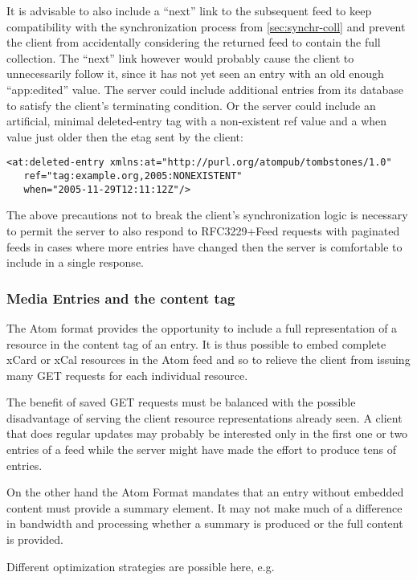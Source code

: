 \documentclass[12pt,a4paper,twoside]{scrartcl}		%
\begin{document}
It is advisable to also include a ``next'' link to the subsequent feed to keep
compatibility with the synchronization process from \autoref{sec:synchr-coll}
and prevent the client from accidentally considering the returned feed to
contain the full collection. The ``next'' link however would probably cause the
client to unnecessarily follow it, since it has not yet seen an entry with an
old enough ``app:edited'' value. The server could include additional entries
from its database to satisfy the client's terminating condition. Or the server
could include an artificial, minimal
deleted-entry\cite{draft-snell-atompub-tombstones-14} tag with a non-existent
ref value and a when value just older then the etag sent by the client:
\begin{lstlisting}
<at:deleted-entry xmlns:at="http://purl.org/atompub/tombstones/1.0"
   ref="tag:example.org,2005:NONEXISTENT"
   when="2005-11-29T12:11:12Z"/>
\end{lstlisting}
The above precautions not to break the client's synchronization logic is
necessary to permit the server to also respond to RFC3229+Feed requests with
paginated feeds in cases where more entries have changed then the server is
comfortable to include in a single response.

\subsubsection{Media Entries and the content tag}
\label{sec:inline-feeds-or}

The Atom format provides the opportunity to include a full representation of a
resource in the content tag of an entry\cite[sec. 4.1.3]{RFC4287}. It is thus
possible to embed complete xCard or xCal resources in the Atom feed
and so to relieve the client from issuing many GET requests for each individual
resource.

The benefit of saved GET requests must be balanced with the possible
disadvantage of serving the client resource representations already seen. A
client that does regular updates may probably be interested only in the first
one or two entries of a feed while the server might have made the effort to
produce tens of entries.

On the other hand the Atom Format mandates that an entry without embedded
content must provide a summary element. It may not make much of a difference in
bandwidth and processing whether a summary is produced or the full content is
provided.

Different optimization strategies are possible here, e.g.
\end{document}
